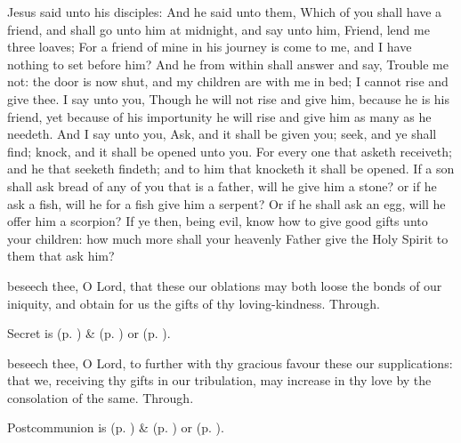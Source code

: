 
 Jesus said unto his disciples: And he said unto them, Which of you shall have a friend, and shall go unto him at midnight, and say unto him, Friend, lend me three loaves; For a friend of mine in his journey is come to me, and I have nothing to set before him? And he from within shall answer and say, Trouble me not: the door is now shut, and my children are with me in bed; I cannot rise and give thee. I say unto you, Though he will not rise and give him, because he is his friend, yet because of his importunity he will rise and give him as many as he needeth. And I say unto you, Ask, and it shall be given you; seek, and ye shall find; knock, and it shall be opened unto you. For every one that asketh receiveth; and he that seeketh findeth; and to him that knocketh it shall be opened. If a son shall ask bread of any of you that is a father, will he give him a stone? or if he ask a fish, will he for a fish give him a serpent? Or if he shall ask an egg, will he offer him a scorpion? If ye then, being evil, know how to give good gifts unto your children: how much more shall your heavenly Father give the Holy Spirit to them that ask him?


\secret
{} beseech thee, O Lord, that these our oblations may both loose the bonds of our iniquity, and obtain for us the gifts of thy loving-kindness. Through.
\begin{rubric}
     Secret is  (p. \pageref{SPMaryInEaster}) \&   (p. \pageref{SPAgainst}) or  (p. \pageref{SPChiefBishop}).
\end{rubric}


\postcommunion
{} beseech thee, O Lord, to further with thy gracious favour these our supplications: that we, receiving thy gifts in our tribulation, may increase in thy love by the consolation of the same. Through.
\begin{rubric}
     Postcommunion is  (p. \pageref{SPMaryInEaster}) \&   (p. \pageref{SPAgainst}) or  (p. \pageref{SPChiefBishop}).
\end{rubric}


